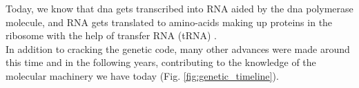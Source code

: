 Today, we know that \gls{dna} gets transcribed into RNA aided by the \gls{dna} polymerase molecule, and RNA gets translated to amino-acids making up proteins in the ribosome with the help of transfer RNA (tRNA) \cite{alberts2018molecular}.\\

In addition to cracking the genetic code, many other advances were made around this time and in the following years, contributing to the knowledge of the molecular machinery we have today (Fig. \ref{fig:genetic_timeline}).


